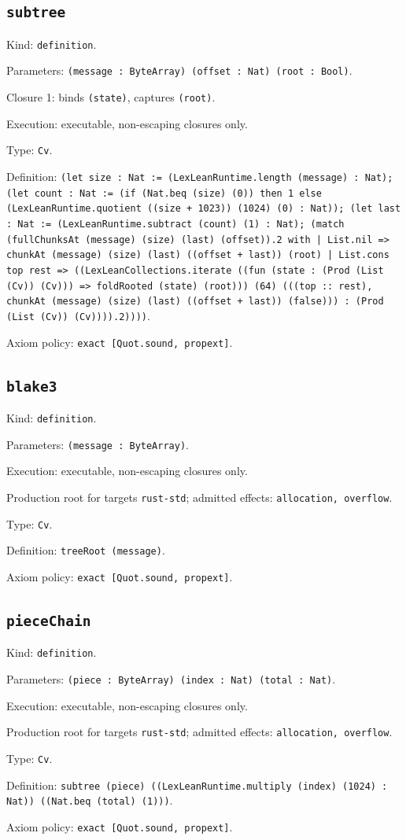 \documentclass[11pt]{article}
\begin{document}
\subsection*{\texttt{subtree}}
\noindent Kind: \texttt{definition}.\par
\noindent Parameters: \texttt{(message : ByteArray) (offset : Nat) (root : Bool)}.\par
\noindent Closure 1: binds \texttt{(state)}, captures \texttt{(root)}.\par
\noindent Execution: executable, non-escaping closures only.\par
\noindent Type: \texttt{Cv}.\par
\noindent Definition: \texttt{(let size : Nat := (LexLeanRuntime.length (message) : Nat); (let count : Nat := (if (Nat.beq (size) (0)) then 1 else (LexLeanRuntime.quotient ((size + 1023)) (1024) (0) : Nat)); (let last : Nat := (LexLeanRuntime.subtract (count) (1) : Nat); (match (fullChunksAt (message) (size) (last) (offset)).2 with | List.nil => chunkAt (message) (size) (last) ((offset + last)) (root) | List.cons top rest => ((LexLeanCollections.iterate ((fun (state : (Prod (List (Cv)) (Cv))) => foldRooted (state) (root))) (64) (((top :: rest), chunkAt (message) (size) (last) ((offset + last)) (false))) : (Prod (List (Cv)) (Cv)))).2))))}.\par
\noindent Axiom policy: \texttt{exact [Quot.sound, propext]}.\par
\subsection*{\texttt{blake3}}
\noindent Kind: \texttt{definition}.\par
\noindent Parameters: \texttt{(message : ByteArray)}.\par
\noindent Execution: executable, non-escaping closures only.\par
\noindent Production root for targets \texttt{rust-std}; admitted effects: \texttt{allocation, overflow}.\par
\noindent Type: \texttt{Cv}.\par
\noindent Definition: \texttt{treeRoot (message)}.\par
\noindent Axiom policy: \texttt{exact [Quot.sound, propext]}.\par
\subsection*{\texttt{pieceChain}}
\noindent Kind: \texttt{definition}.\par
\noindent Parameters: \texttt{(piece : ByteArray) (index : Nat) (total : Nat)}.\par
\noindent Execution: executable, non-escaping closures only.\par
\noindent Production root for targets \texttt{rust-std}; admitted effects: \texttt{allocation, overflow}.\par
\noindent Type: \texttt{Cv}.\par
\noindent Definition: \texttt{subtree (piece) ((LexLeanRuntime.multiply (index) (1024) : Nat)) ((Nat.beq (total) (1)))}.\par
\noindent Axiom policy: \texttt{exact [Quot.sound, propext]}.\par
\end{document}

